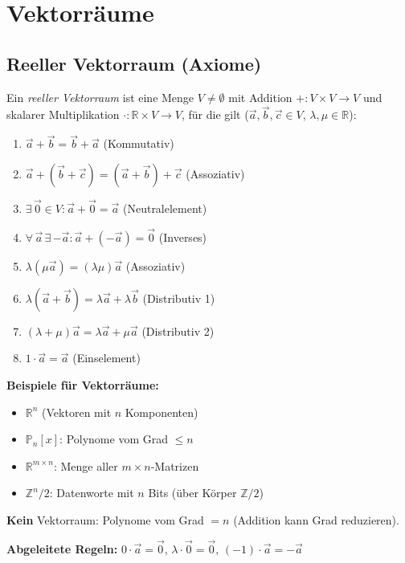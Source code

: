 \section{Vektorräume}

\subsection{Reeller Vektorraum (Axiome)}
Ein \emph{reeller Vektorraum} ist eine Menge $V \neq \emptyset$ mit Addition $+: V \times V \to V$ und skalarer Multiplikation $\cdot: \mathbb{R} \times V \to V$, für die gilt ($\vec{a}, \vec{b}, \vec{c} \in V$, $\lambda, \mu \in \mathbb{R}$):

\begin{enumerate}
    \item $\vec{a} + \vec{b} = \vec{b} + \vec{a}$ \quad (Kommutativ)
    \item $\vec{a} + (\vec{b} + \vec{c}) = (\vec{a} + \vec{b}) + \vec{c}$ \quad (Assoziativ)
    \item $\exists\, \vec{0} \in V: \vec{a} + \vec{0} = \vec{a}$ \quad (Neutralelement)
    \item $\forall\, \vec{a}\, \exists\, {-\vec{a}}: \vec{a} + (-\vec{a}) = \vec{0}$ \quad (Inverses)
    \item $\lambda(\mu \vec{a}) = (\lambda\mu)\vec{a}$ \quad (Assoziativ)
    \item $\lambda(\vec{a} + \vec{b}) = \lambda\vec{a} + \lambda\vec{b}$ \quad (Distributiv 1)
    \item $(\lambda + \mu)\vec{a} = \lambda\vec{a} + \mu\vec{a}$ \quad (Distributiv 2)
    \item $1 \cdot \vec{a} = \vec{a}$ \quad (Einselement)
\end{enumerate}

\textbf{Beispiele für Vektorräume:}
\begin{itemize}
    \item $\mathbb{R}^n$ (Vektoren mit $n$ Komponenten)
    \item $\mathbb{P}_n[x]$: Polynome vom Grad $\leq n$
    \item $\mathbb{R}^{m \times n}$: Menge aller $m \times n$-Matrizen
    \item $\mathbb{Z}^n/2$: Datenworte mit $n$ Bits (über Körper $\mathbb{Z}/2$)
\end{itemize}

\textbf{Kein} Vektorraum: Polynome vom Grad $= n$ (Addition kann Grad reduzieren).

\textbf{Abgeleitete Regeln:}
$0 \cdot \vec{a} = \vec{0}$, \quad $\lambda \cdot \vec{0} = \vec{0}$, \quad $(-1) \cdot \vec{a} = -\vec{a}$

